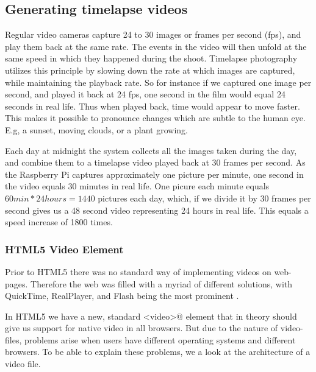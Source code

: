 \subsection{Generating timelapse videos}
Regular video cameras capture 24 to 30 images or frames per second (fps), and play them back at the same rate. The events in the video will then unfold at the same speed in which they happened during the shoot. Timelapse photography utilizes this principle by slowing down the rate at which images are captured, while maintaining the playback rate. So for instance if we captured one image per second, and played it back at 24 fps, one second in the film would equal 24 seconds in real life. Thus when played back, time would appear to move faster. This makes it possible to pronounce changes which are subtle to the human eye. E.g, a sunset, moving clouds, or a plant growing.  

Each day at midnight the system collects all the images taken during the day, and combine them to a timelapse video played back at 30 frames per second. As the Raspberry Pi captures approximately one picture per minute, one second in the video equals 30 minutes in real life. One picure each minute equals \begin{math} 60min*24hours=1440 \end{math}
pictures each day, which, if we divide it by 30 frames per second gives us a 48 second video representing 24 hours in real life. This equals a speed increase of 1800 times. 


\subsubsection{HTML5 Video Element}
Prior to HTML5 there was no standard way of implementing videos on web-pages. Therefore the web was filled with a myriad of different solutions, with QuickTime, RealPlayer, and Flash being the most prominent \citep{pilgrim2010html5}.

In HTML5 we have a new, standard \verb@<video>@ element that in theory should give us support for native video in all browsers. But due to the nature of video-files, problems arise when users have different operating systems and different browsers. To be able to explain these problems, we a look at the architecture of a video file.

